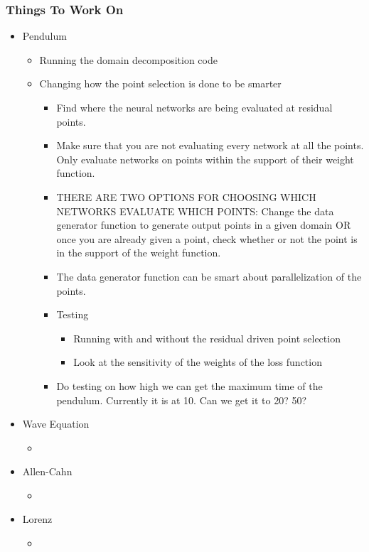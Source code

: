 \documentclass{article}
\begin{document}
\subsubsection*{Things To Work On}
\begin{itemize}
	\item Pendulum
	\begin{itemize}
		\item Running the domain decomposition code
		\item Changing how the point selection is done to be smarter
		\begin{itemize}
			\item Find where the neural networks are being evaluated at residual points.
			\item Make sure that you are not evaluating every network at all the points. Only evaluate networks on points within the support of their weight function.
			\item THERE ARE TWO OPTIONS FOR CHOOSING WHICH NETWORKS EVALUATE WHICH POINTS: Change the data generator function to generate output points in a given domain OR once you are already given a point, check whether or not the point is in the support of the weight function.
			\item The data generator function can be smart about parallelization of the points.
			\item Testing
			\begin{itemize}
				\item Running with and without the residual driven point selection
				\item Look at the sensitivity of the weights of the loss function
			\end{itemize}
			\item Do testing on how high we can get the maximum time of the pendulum. Currently it is at 10. Can we get it to 20? 50?
		\end{itemize}
	\end{itemize}
	\item Wave Equation
	\begin{itemize}
		\item 
	\end{itemize}
	\item Allen-Cahn
	\begin{itemize}
		\item 
	\end{itemize}
	\item Lorenz
	\begin{itemize}
		\item 
	\end{itemize}
\end{itemize}
\newpage
\end{document}
